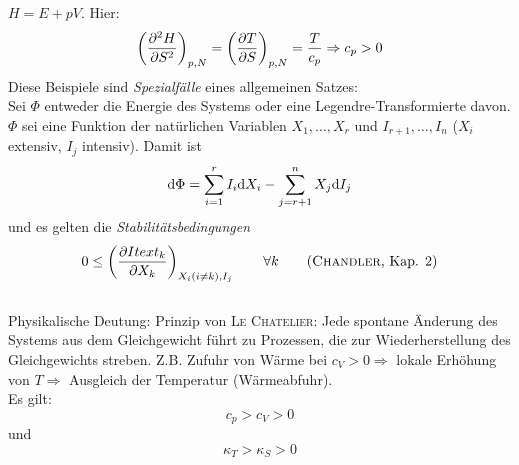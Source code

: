 $H = E + pV$. Hier:
\begin{equation}
    \left( \frac{\partial^2 H}{\partial S^2} \right)_{p, N} = \left( \frac{\partial T}{\partial S} \right)_{p, N} = \frac{T}{c_p} \Rightarrow c_p > 0
\end{equation}
Diese Beispiele sind \emph{Spezialfälle} eines allgemeinen Satzes: \\[\baselineskip]
Sei $\Phi$ entweder die Energie des Systems oder eine Legendre-Transformierte davon. $\Phi$ sei eine Funktion der natürlichen Variablen 
$X_1, \ldots, X_r$ und $I_{r+1}, \ldots, I_n$ ($X_i$ extensiv, $I_j$ intensiv). Damit ist
\begin{equation}
    \mathrm{d} \Phi = \sum_{i=1}^{r}  I_i \mathrm{d} X_i - \sum_{j=r+1}^{n} X_j \mathrm{d} I_j
\end{equation}
und es gelten die \emph{Stabilitätsbedingungen}
\begin{equation}
    0 \leq \left( \frac{\partial Itext_k}{\partial X_k} \right)_{X_i (i \neq k), I_j} \qquad \forall k \qquad \text{(\textsc{Chandler}, Kap. 2)}
\end{equation}\\
Physikalische Deutung: Prinzip von \textsc{Le Chatelier}: Jede spontane Änderung des Systems aus dem Gleichgewicht führt zu Prozessen, die zur 
Wiederherstellung des Gleichgewichts streben. Z.B. Zufuhr von Wärme bei $c_V > 0 \Rightarrow$ lokale Erhöhung von $T \Rightarrow $ 
Ausgleich der Temperatur (Wärmeabfuhr). \\[\baselineskip]
Es gilt:
\begin{equation}
    c_p > c_V > 0
\end{equation}
und
\begin{equation}
    \kappa_T > \kappa_S > 0
\end{equation}